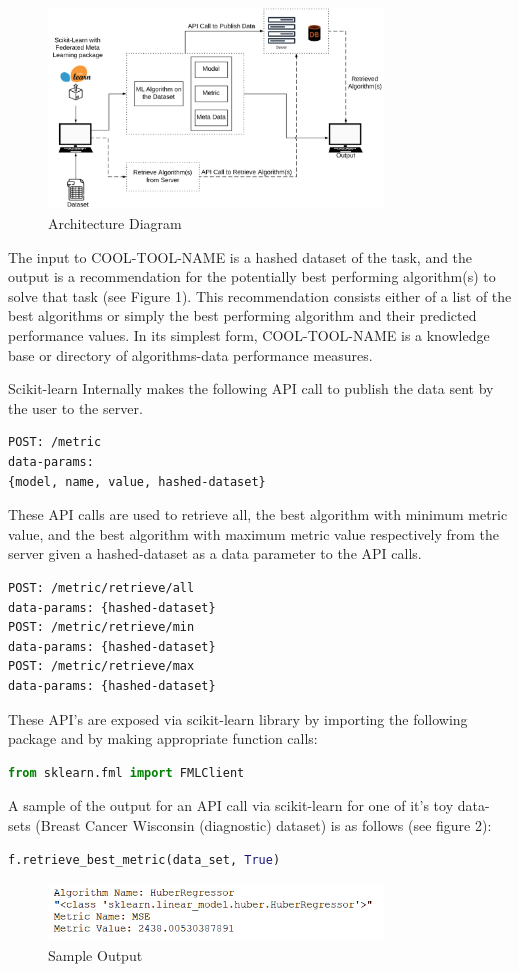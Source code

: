 \documentclass{article}
\begin{document}
\begin{figure}[h]
    \centering
    \includegraphics[width=3.5in]{architecture-diagram.PNG}
    \caption{Architecture Diagram}
    \label{architecture-diagram}
\end{figure}

The input to COOL-TOOL-NAME is a hashed dataset of the task, and the output is a recommendation for the potentially best performing algorithm(s) to solve that task (see Figure 1). This recommendation consists either of a list of the best algorithms or simply the best performing algorithm and their predicted performance values. In its simplest form, COOL-TOOL-NAME is a knowledge base or directory of algorithms-data performance measures.

Scikit-learn Internally makes the following API call to publish the data sent by the user to the server.
\begin{lstlisting}
POST: /metric
data-params: 
{model, name, value, hashed-dataset}
\end{lstlisting}

These API calls are used to retrieve all, the best algorithm with minimum metric value, and the best algorithm with maximum metric value respectively from the server given a hashed-dataset as a data parameter to the API calls.
\begin{lstlisting}
POST: /metric/retrieve/all
data-params: {hashed-dataset}
POST: /metric/retrieve/min
data-params: {hashed-dataset}
POST: /metric/retrieve/max
data-params: {hashed-dataset}
\end{lstlisting}

These API's are exposed via scikit-learn library by importing the following package and by making appropriate function calls:
\begin{lstlisting}[language=python]
from sklearn.fml import FMLClient
\end{lstlisting}

A sample of the output for an API call via scikit-learn for one of it's toy data-sets (Breast Cancer Wisconsin (diagnostic) dataset) \cite{william-et-al} is as follows (see figure 2):
\begin{lstlisting}[language=python]
f.retrieve_best_metric(data_set, True)
\end{lstlisting}
\begin{figure}[ht]
    \centering
    \includegraphics[width=3.5in]{sample-output.PNG}
    \caption{Sample Output}
    \label{sample-output}
\end{figure}
\end{document}

